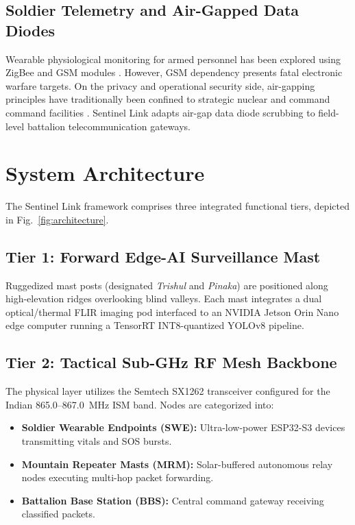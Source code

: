 \documentclass[conference]{IEEEtran}
\begin{document}
\subsection{Soldier Telemetry and Air-Gapped Data Diodes}
Wearable physiological monitoring for armed personnel has been explored using ZigBee and GSM modules \cite{kumar2017soldier}. However, GSM dependency presents fatal electronic warfare targets. On the privacy and operational security side, air-gapping principles have traditionally been confined to strategic nuclear and command command facilities \cite{decarvalho2020airgap}. Sentinel Link adapts air-gap data diode scrubbing to field-level battalion telecommunication gateways.

\section{System Architecture}

The Sentinel Link framework comprises three integrated functional tiers, depicted in Fig.~\ref{fig:architecture}.

\subsection{Tier 1: Forward Edge-AI Surveillance Mast}
Ruggedized mast posts (designated \textit{Trishul} and \textit{Pinaka}) are positioned along high-elevation ridges overlooking blind valleys. Each mast integrates a dual optical/thermal FLIR imaging pod interfaced to an NVIDIA Jetson Orin Nano edge computer running a TensorRT INT8-quantized YOLOv8 pipeline.

\subsection{Tier 2: Tactical Sub-GHz RF Mesh Backbone}
The physical layer utilizes the Semtech SX1262 transceiver configured for the Indian 865.0--867.0~MHz ISM band. Nodes are categorized into:
\begin{itemize}
    \item \textbf{Soldier Wearable Endpoints (SWE):} Ultra-low-power ESP32-S3 devices transmitting vitals and SOS bursts.
    \item \textbf{Mountain Repeater Masts (MRM):} Solar-buffered autonomous relay nodes executing multi-hop packet forwarding.
    \item \textbf{Battalion Base Station (BBS):} Central command gateway receiving classified packets.
\end{itemize}
\end{document}
